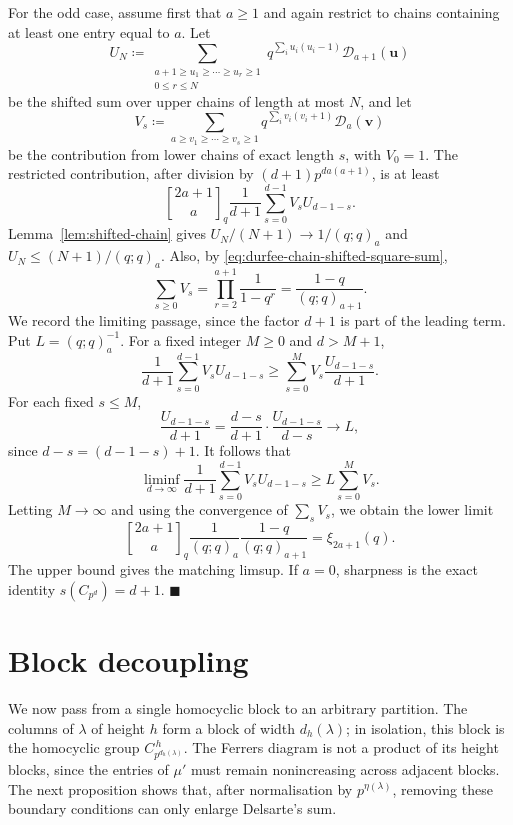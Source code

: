 \documentclass[a4paper,11pt,reqno]{amsart}
\theoremstyle{plain}
\theoremstyle{remark}
\numberwithin{equation}{section}
\newcommand{\qgauss}[2]{\genfrac{[}{]}{0pt}{}{#1}{#2}_q}
\renewcommand{\leq}{\leqslant}
\renewcommand{\geq}{\geqslant}
\newenvironment{proofof}{{\bf Proof. }}{\hfill $\blacksquare$ \\}
\begin{document}
\begin{proofof}
For the odd case, assume first that $a\geq 1$ and again restrict to chains
containing at least one entry equal to $a$. Let
\[
        U_N\coloneqq
        \sum_{\substack{a+1\geq u_1\geq\cdots\geq u_r\geq 1\\0\leq r\leq N}}
        q^{\sum_i u_i(u_i-1)}\mathcal D_{a+1}(\mathbf u)
\]
be the shifted sum over upper chains of length at most $N$, and let
\[
        V_s\coloneqq
        \sum_{a\geq v_1\geq\cdots\geq v_s\geq 1}
        q^{\sum_i v_i(v_i+1)}\mathcal D_a(\mathbf v)
\]
be the contribution from lower chains of exact length $s$, with $V_0=1$. The
restricted contribution, after division by $(d+1)p^{da(a+1)}$, is at least
\[
        \qgauss{2a+1}{a}\frac{1}{d+1}
        \sum_{s=0}^{d-1} V_s U_{d-1-s}.
\]
Lemma~\ref{lem:shifted-chain} gives $U_N/(N+1)\to 1/(q;q)_a$ and
$U_N\leq (N+1)/(q;q)_a$. Also, by \eqref{eq:durfee-chain-shifted-square-sum},
\[
        \sum_{s\geq 0}V_s
        =
        \prod_{r=2}^{a+1}\frac{1}{1-q^r}
        =
        \frac{1-q}{(q;q)_{a+1}}.
\]
We record the limiting passage, since the factor $d+1$ is part of the leading
term. Put $L=(q;q)_a^{-1}$. For a fixed integer $M\geq 0$ and $d>M+1$,
\[
        \frac{1}{d+1}\sum_{s=0}^{d-1}V_sU_{d-1-s}
        \geq
        \sum_{s=0}^{M}V_s\frac{U_{d-1-s}}{d+1}.
\]
For each fixed $s\leq M$,
\[
        \frac{U_{d-1-s}}{d+1}
        =
        \frac{d-s}{d+1}\cdot \frac{U_{d-1-s}}{d-s}
        \longrightarrow L,
\]
since $d-s=(d-1-s)+1$. It follows that
\[
        \liminf_{d\to\infty}
        \frac{1}{d+1}\sum_{s=0}^{d-1}V_sU_{d-1-s}
        \geq
        L\sum_{s=0}^{M}V_s.
\]
Letting $M\to\infty$ and using the convergence of $\sum_sV_s$, we obtain the
lower limit
\[
        \qgauss{2a+1}{a}\frac{1}{(q;q)_a}\frac{1-q}{(q;q)_{a+1}}
        =\xi_{2a+1}(q).
\]
The upper bound gives the matching limsup. If $a=0$, sharpness is the exact
identity $s(C_{p^d})=d+1$.
\end{proofof}

\section{Block decoupling}
\label{sec:block-decoupling}

We now pass from a single homocyclic block to an arbitrary partition. The
columns of $\lambda$ of height $h$ form a block of width $d_h(\lambda)$; in
isolation, this block is the homocyclic group $C_{p^{d_h(\lambda)}}^{\,h}$.
The Ferrers diagram is not a product of its height blocks, since the entries of
$\mu'$ must remain nonincreasing across adjacent blocks. The next proposition
shows that, after normalisation by $p^{\eta(\lambda)}$, removing these boundary
conditions can only enlarge Delsarte's sum.
\end{document}
